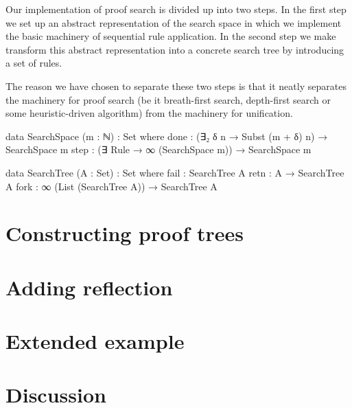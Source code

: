 \documentclass[preprint]{sigplanconf}
\begin{document}
Our implementation of proof search is divided up into two steps.
In the first step we set up an abstract representation of the search
space in which we implement the basic machinery of sequential rule
application.
In the second step we make transform this abstract representation into
a concrete search tree by introducing a set of rules.

The reason we have chosen to separate these two steps is that it
neatly separates the machinery for proof search (be it breath-first
search, depth-first search or some heuristic-driven algorithm) from
the machinery for unification.


\begin{code}
  data SearchSpace (m : ℕ) : Set where
    done : (∃₂ δ n → Subst (m + δ) n) → SearchSpace m
    step : (∃ Rule → ∞ (SearchSpace m)) → SearchSpace m
\end{code}


\begin{code}
  data SearchTree (A : Set) : Set where
    fail : SearchTree A
    retn : A → SearchTree A
    fork : ∞ (List (SearchTree A)) → SearchTree A
\end{code}


\section{Constructing proof trees}
\label{sec:proofs}

\section{Adding reflection}
\label{sec:reflection}


\section{Extended example}
\label{sec:example}


\section{Discussion}
\label{sec:discussion}
\end{document}
